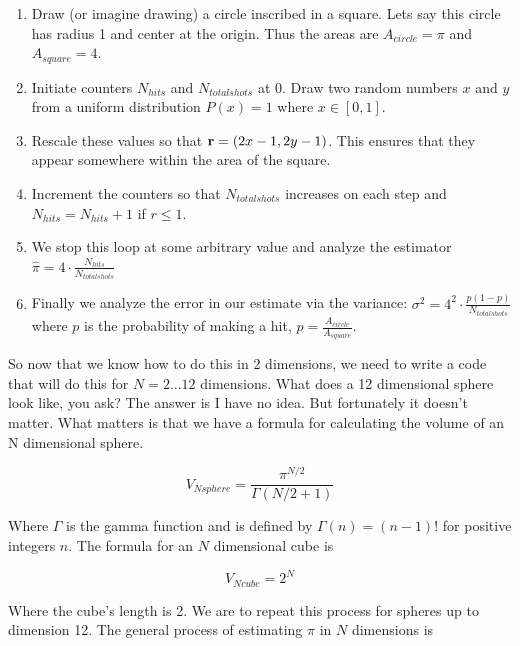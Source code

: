 \documentclass[11pt]{amsart}
\begin{document}
\begin{enumerate}
\item Draw (or imagine drawing) a circle inscribed in a square. Lets say this circle has radius 1 and center at the origin.  Thus the areas are $A_{circle}=\pi$ and $A_{square}=4$.
\item Initiate counters $N_{hits}$ and $N_{total shots}$ at $0$.  Draw two random numbers $x$ and $y$ from a uniform distribution $P(x)=1$ where $x \in [0,1]$.  
\item Rescale these values so that $\textbf r =(2x-1,2y-1)$.  This ensures that they appear somewhere within the area of the square.
\item Increment the counters so that $N_{total shots}$ increases on each step and $N_{hits}=N_{hits}+1$ if $r \leq 1$.
\item We stop this loop at some arbitrary value and analyze the estimator $\hat \pi = 4 \cdot \frac {N_{hits}} {N_{total shots}}$
\item Finally we analyze the error in our estimate via the variance: \newline $\sigma ^2 = 4^2 \cdot \frac{p (1-p)}{N_{totalshots}}$ where $p$ is the probability of making a hit, $p=\frac{A_{circle}}{A_{square}}$.
\end{enumerate}
\vspace{5 mm}

So now that we know how to do this in 2 dimensions, we need to write a code that will do this for $N=2...12$ dimensions.  What does a 12 dimensional sphere look like, you ask?  The answer is I have no idea.  But fortunately it doesn't matter.  What matters is that we have a formula for calculating the volume of an N dimensional sphere.

\begin{equation}
V_{Nsphere} = \frac {\pi ^{N/2}} {\Gamma (N/2+1)}
\end{equation}
\vspace{5 mm}

Where $\Gamma$ is the gamma function and is defined by $\Gamma(n)=(n-1)!$ for positive integers $n$.  The formula for an $N$ dimensional cube is 

\begin{equation}
V_{Ncube}=2^N
\end{equation}
\vspace{5 mm}

Where the cube's length is 2.  We are to repeat this process for spheres up to dimension 12.  The general process of estimating $\pi$ in $N$ dimensions is
\end{document}
